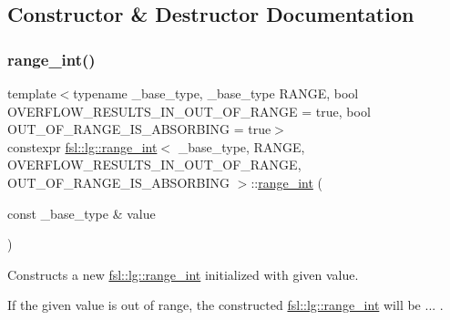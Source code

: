 \subsection{Constructor \& Destructor Documentation}
\mbox{\label{classfsl_1_1lg_1_1range__int_a1a1400253adfd449299c41cea331ee61}} 
\subsubsection{\texorpdfstring{range\_int()}{range\_int()}}
{\footnotesize\ttfamily template$<$typename \+\_\+base\+\_\+type, \+\_\+base\+\_\+type R\+A\+N\+GE, bool O\+V\+E\+R\+F\+L\+O\+W\+\_\+\+R\+E\+S\+U\+L\+T\+S\+\_\+\+I\+N\+\_\+\+O\+U\+T\+\_\+\+O\+F\+\_\+\+R\+A\+N\+GE = true, bool O\+U\+T\+\_\+\+O\+F\+\_\+\+R\+A\+N\+G\+E\+\_\+\+I\+S\+\_\+\+A\+B\+S\+O\+R\+B\+I\+NG = true$>$ \\
constexpr \mbox{\hyperlink{classfsl_1_1lg_1_1range__int}{fsl\+::lg\+::range\+\_\+int}}$<$ \+\_\+base\+\_\+type, R\+A\+N\+GE, O\+V\+E\+R\+F\+L\+O\+W\+\_\+\+R\+E\+S\+U\+L\+T\+S\+\_\+\+I\+N\+\_\+\+O\+U\+T\+\_\+\+O\+F\+\_\+\+R\+A\+N\+GE, O\+U\+T\+\_\+\+O\+F\+\_\+\+R\+A\+N\+G\+E\+\_\+\+I\+S\+\_\+\+A\+B\+S\+O\+R\+B\+I\+NG $>$\+::\mbox{\hyperlink{classfsl_1_1lg_1_1range__int}{range\+\_\+int}} (\begin{DoxyParamCaption}\item[{const \+\_\+base\+\_\+type \&}]{value }\end{DoxyParamCaption})\hspace{0.3cm}{\ttfamily [inline]}}

Constructs a new \mbox{\hyperlink{classfsl_1_1lg_1_1range__int}{fsl\+::lg\+::range\+\_\+int}} initialized with given value.

If the given value is out of range, the constructed \mbox{\hyperlink{classfsl_1_1lg_1_1range__int}{fsl\+::lg\+::range\+\_\+int}} will be ... . 

